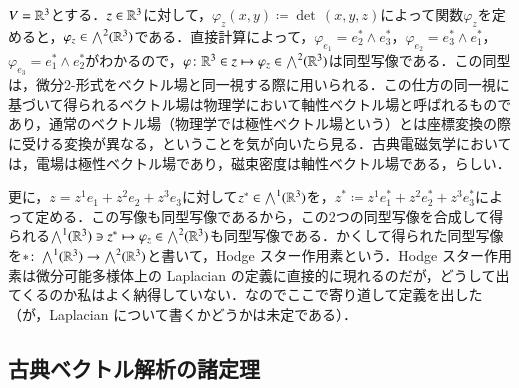 \begin{exm}
$V = \mathbb{R}^3$とする．$z \in \mathbb{R}^3$に対して，$\varphi_z(x,y) \coloneqq \det\, (x,y,z)$によって関数$\varphi_z$を定めると，$\varphi_z \in \bigwedge^2(\mathbb{R}^3)$である．直接計算によって，$\varphi_{e_1} = e_2^* \wedge e_3^*$，$\varphi_{e_2} = e_3^* \wedge e_1^*$，$\varphi_{e_3} = e_1^* \wedge e_2^*$がわかるので，$\varphi \colon \mathbb{R}^3 \in z \mapsto \varphi_z \in \bigwedge^2(\mathbb{R}^3)$は同型写像である．この同型は，微分2-形式をベクトル場と同一視する際に用いられる．この仕方の同一視に基づいて得られるベクトル場は物理学において軸性ベクトル場と呼ばれるものであり，通常のベクトル場（物理学では極性ベクトル場という）とは座標変換の際に受ける変換が異なる，ということを気が向いたら見る．古典電磁気学においては，電場は極性ベクトル場であり，磁束密度は軸性ベクトル場である，らしい．
\end{exm}

\begin{exm}
更に，$z = z^1 e_1 + z^2 e_2 + z^3 e_3$に対して$z^* \in \bigwedge^1(\mathbb{R}^3)$を，$z^* \coloneqq z^1 e_1^* + z^2 e_2^* + z^3 e_3^*$によって定める．この写像も同型写像であるから，この2つの同型写像を合成して得られる$\bigwedge^1(\mathbb{R}^3) \ni z^* \mapsto \varphi_z \in \bigwedge^2(\mathbb{R}^3)$も同型写像である．かくして得られた同型写像を$* \colon \bigwedge^1(\mathbb{R}^3) \to \bigwedge^2(\mathbb{R}^3)$と書いて，Hodge スター作用素という．Hodge スター作用素は微分可能多様体上の Laplacian の定義に直接的に現れるのだが，どうして出てくるのか私はよく納得していない．なのでここで寄り道して定義を出した（が，Laplacian について書くかどうかは未定である）．
\end{exm}


\subsection{古典ベクトル解析の諸定理}
